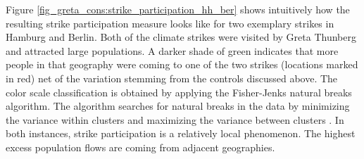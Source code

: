 Figure \ref{fig_greta_cons:strike_participation_hh_ber} shows intuitively how the resulting strike participation measure looks like for two exemplary strikes in Hamburg and Berlin. Both of the climate strikes were visited by Greta Thunberg and attracted large populations. A darker shade of green indicates that more people in that geography were coming to one of the two strikes (locations marked in red) net of the variation stemming from the controls discussed above. The color scale classification is obtained by applying the Fisher-Jenks natural breaks algorithm. The algorithm searches for natural breaks in the data by minimizing the variance within clusters and maximizing the variance between clusters \citep{jenks1967data}. In both instances, strike participation is a relatively local phenomenon. The highest excess population flows are coming from adjacent geographies.






